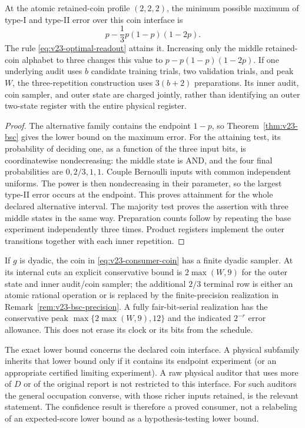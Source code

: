 \begin{corollary}
\label{cor:v23-confidence}
At the atomic retained-coin profile $(2,2,2)$, the minimum possible
maximum of type-I and type-II error over this coin interface is
\begin{equation}\label{eq:v23-confidence-exact}
 p-\frac13p(1-p)(1-2p).
\end{equation}
The rule \eqref{eq:v23-optimal-readout} attains it. Increasing only the
middle retained-coin alphabet to three changes this value to
$p-p(1-p)(1-2p)$. If one underlying audit uses $b$ candidate training
trials, two validation trials, and peak $W$, the three-repetition
construction uses $3(b+2)$ preparations. Its inner audit, coin sampler,
and outer state are charged jointly, rather than identifying an outer
two-state register with the entire physical register.
\end{corollary}
\begin{proof}
The alternative family contains the endpoint $1-p$, so
Theorem~\ref{thm:v23-bsc} gives the lower bound on the maximum error.
For the attaining test, its probability of deciding one, as a function
of the three input bits, is coordinatewise nondecreasing: the middle
state is AND, and the four final probabilities are $0,2/3,1,1$.
Couple Bernoulli inputs with common independent uniforms. The power
is then nondecreasing in their parameter, so the largest type-II error
occurs at the endpoint. This proves attainment for the whole declared
alternative interval. The majority test proves the assertion with
three middle states in the same way. Preparation counts follow by
repeating the base experiment independently three times. Product
registers implement the outer transitions together with each inner
repetition.
\end{proof}

If $g$ is dyadic, the coin in \eqref{eq:v23-consumer-coin} has a finite
dyadic sampler. At its internal cuts an explicit conservative bound
is $2\max(W,9)$ for the outer state and inner audit/coin sampler; the
additional $2/3$ terminal row is either an atomic rational operation or
is replaced by the finite-precision realization in
Remark~\ref{rem:v23-bsc-precision}. A fully fair-bit-serial realization
has the conservative peak $\max\{2\max(W,9),12\}$ and the indicated
$2^{-r}$ error allowance. This does not erase its clock or its bits
from the schedule.

The exact lower bound concerns the declared coin interface. A physical
subfamily inherits that lower bound only if it contains its endpoint
experiment (or an appropriate certified limiting experiment). A raw
physical auditor that uses more of $D$ or of the original report is
not restricted to this interface. For such auditors the general
occupation converse, with those richer inputs retained, is the relevant
statement. The confidence result is therefore a proved consumer, not a
relabeling of an expected-score lower bound as a hypothesis-testing
lower bound.

